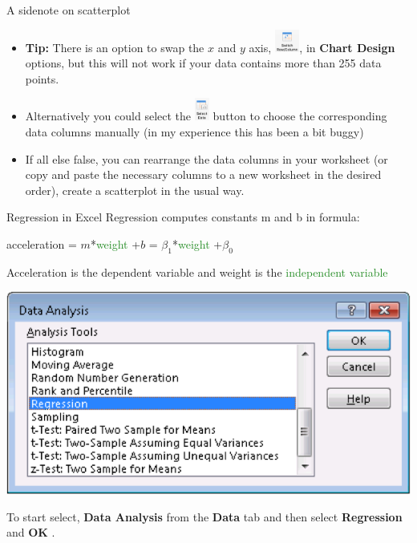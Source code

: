 \documentclass[xcolor=svgnames, handout]{beamer}
\newcommand{\yellow}[1]{\textcolor{iyellow}{#1}}
\begin{document}
\begin{frame}{A sidenote on scatterplot}
\begin{itemize}
\item {\bf Tip:}  There is an option to swap the $x$ and $y$ axis,  \includegraphics[height=2em]{img/switch}, in {\bf Chart Design} options, but this will not work if your data contains more than 255 data points. 
\medskip
\item Alternatively you could select the  \includegraphics[height=2em]{img/selectdata} button to choose the corresponding data columns manually (in my experience this has been a bit buggy)
\medskip
\item If all else false, you can rearrange the data columns in your worksheet (or copy and paste the necessary columns to a new worksheet in the desired order), create a scatterplot in the usual way.
\end{itemize}

\end{frame}




\begin{frame}[label=current]{Regression in Excel}
Regression computes constants m and b in formula:
\begin{center}
\yellow{acceleration} = $m$*\textcolor{ForestGreen}{weight} +$b$ = $\beta_1$*\textcolor{ForestGreen}{weight} +$\beta_0$
\end{center}
Acceleration is the \yellow{dependent variable} and weight is the \textcolor{ForestGreen}{independent variable}\\[1em]
\begin{center}
\includegraphics[height=.45\textheight]{Regression2}
\end{center}
To start select, {\bf Data Analysis} from the {\bf Data} tab  and then select {\bf Regression} and {\bf OK} . 
\end{frame}
\end{document}
